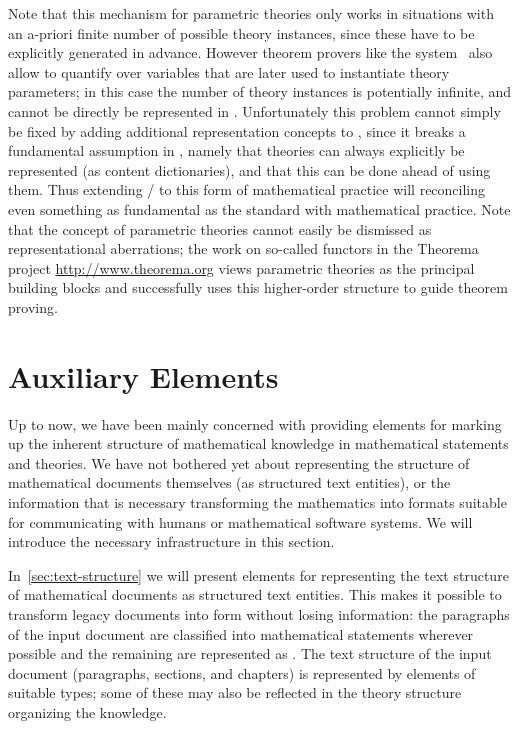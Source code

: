 Note that this mechanism for parametric theories only works in situations with an
a-priori finite number of possible theory instances, since these have to be
explicitly generated in advance. However theorem provers like the {\pvs}
system~\cite{OwRu92} also allow to quantify over variables that are later used to
instantiate theory parameters; in this case the number of theory instances is
potentially infinite, and cannot be directly be represented in {\omdoc}.
Unfortunately this problem cannot simply be fixed by adding additional
representation concepts to {\omdoc}, since it breaks a fundamental assumption in
{\openmath}, namely that theories can always explicitly be represented (as content
dictionaries), and that this can be done ahead of using them. Thus extending
{\mbase}/{\omdoc} to this form of mathematical practice will reconciling even
something as fundamental as the {\openmath} standard with mathematical practice.
Note that the concept of parametric theories cannot easily be dismissed as
representational aberrations; the work on so-called functors in the Theorema
project {\url{http://www.theorema.org}} views parametric theories as the principal
building blocks and successfully uses this higher-order structure to guide theorem
proving.

\section{Auxiliary Elements}\label{sec:auxitems}

Up to now, we have been mainly concerned with providing elements for marking up
the inherent structure of mathematical knowledge in mathematical statements and
theories. We have not bothered yet about representing the structure of
mathematical documents themselves (as structured text entities), or the
information that is necessary transforming the mathematics into formats suitable
for communicating with humans or mathematical software systems. We will introduce
the necessary infrastructure in this section.

In~\ref{sec:text-structure} we will present {\omdoc} elements for representing the
text structure of mathematical documents as structured text entities. This makes
it possible to transform legacy documents into {\omdoc} form without losing
information: the paragraphs of the input document are classified into mathematical
statements wherever possible and the remaining are represented as
{}. The text structure of the input document (paragraphs, sections,
and chapters) is represented by {} elements of suitable types;
some of these may also be reflected in the theory structure organizing the
knowledge.


